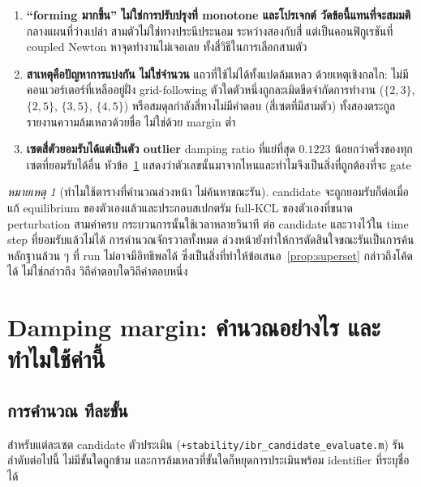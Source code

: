 \documentclass[12pt,a4paper]{article}
\theoremstyle{remark}
\newtheorem{remark}{หมายเหตุ}
\newcommand{\code}[1]{\texttt{\small #1}}
\begin{document}
\begin{enumerate}[leftmargin=1.9em]
\item \textbf{``forming มากขึ้น'' ไม่ใช่การปรับปรุงที่ monotone และโปรเจกต์
      วัดข้อนี้แทนที่จะสมมติ} กลางแผนที่ว่างเปล่า สามตัวไม่ใช่ทางประนีประนอม
      ระหว่างสองกับสี่ แต่เป็นคอนฟิกูเรชันที่ coupled Newton หาจุดทำงานไม่เจอเลย
      ทั้งสี่วิธีในการเลือกสามตัว
\item \textbf{สาเหตุคือปัญหาการแบ่งกัน ไม่ใช่จำนวน} แถวที่ใช้ไม่ได้ทั้งแปดล้มเหลว
      ด้วยเหตุเชิงกลไก: ไม่มีคอนเวอร์เตอร์ที่เหลืออยู่ฝั่ง grid-following
      ตัวใดตัวหนึ่งถูกละเมิดขีดจำกัดการทำงาน ($\{2,3\}$, $\{2,5\}$, $\{3,5\}$,
      $\{4,5\}$) หรือสมดุลกำลังสี่ทางไม่มีคำตอบ (สี่เซตที่มีสามตัว)
      ทั้งสองตระกูลรายงานความล้มเหลวด้วยชื่อ ไม่ใช่ด้วย margin ต่ำ
\item \textbf{เซตสี่ตัวยอมรับได้แต่เป็นตัว outlier} damping ratio ที่แย่ที่สุด
      $0.1223$ น้อยกว่าครึ่งของทุกเซตที่ยอมรับได้อื่น หัวข้อ~\ref{sec:damping}
      แสดงว่าตัวเลขนั้นมาจากไหนและทำไมจึงเป็นสิ่งที่ถูกต้องที่จะ gate
\end{enumerate}

\begin{remark}[ทำไมใช้ตารางที่คำนวณล่วงหน้า ไม่ค้นหาขณะรัน]
candidate จะถูกยอมรับก็ต่อเมื่อแก้ equilibrium ของตัวเองแล้วและประกอบสเปกตรัม
full-KCL ของตัวเองที่ขนาด perturbation สามค่าครบ กระบวนการนั้นใช้เวลาหลายวินาที
ต่อ candidate และวางไว้ใน time step ที่ยอมรับแล้วไม่ได้ การคำนวณจักรวาลทั้งหมด
ล่วงหน้ายังทำให้การตัดสินใจขณะรันเป็นการค้นหลักฐานล้วน ๆ ที่ run ไม่อาจมีอิทธิพลได้
ซึ่งเป็นสิ่งที่ทำให้ข้อเสนอ~\ref{prop:superset} กล่าวถึงโค้ดได้ ไม่ใช่กล่าวถึง
วิถีคำตอบใดวิถีคำตอบหนึ่ง
\end{remark}

\section{Damping margin: คำนวณอย่างไร และทำไมใช้ค่านี้}\label{sec:damping}

\subsection{การคำนวณ ทีละขั้น}

สำหรับแต่ละเซต candidate ตัวประเมิน
(\code{+stability/ibr\_candidate\_evaluate.m}) รันลำดับต่อไปนี้ ไม่มีขั้นใดถูกข้าม
และการล้มเหลวที่ขั้นใดก็หยุดการประเมินพร้อม identifier ที่ระบุชื่อได้
\end{document}
